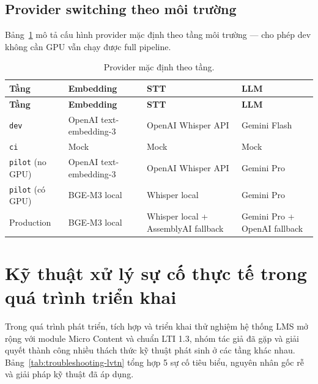 \subsection{Provider switching theo môi trường}

Bảng~\ref{tab:provider-matrix} mô tả cấu hình provider mặc định theo
tầng môi trường --- cho phép dev không cần GPU vẫn chạy được full
pipeline.

\begin{longtable}{|p{2.5cm}|p{3.5cm}|p{3.5cm}|p{3.5cm}|}
\caption{Provider mặc định theo tầng.}
\label{tab:provider-matrix} \\
\hline
\textbf{Tầng} & \textbf{Embedding} & \textbf{STT} & \textbf{LLM} \\
\hline
\endfirsthead
\hline
\textbf{Tầng} & \textbf{Embedding} & \textbf{STT} & \textbf{LLM} \\
\hline
\endhead

\texttt{dev} & OpenAI text-embedding-3 & OpenAI Whisper API &
    Gemini Flash \\
\hline
\texttt{ci} & Mock & Mock & Mock \\
\hline
\texttt{pilot} (no GPU) & OpenAI text-embedding-3 & OpenAI Whisper API
    & Gemini Pro \\
\hline
\texttt{pilot} (có GPU) & BGE-M3 local & Whisper local &
    Gemini Pro \\
\hline
Production & BGE-M3 local & Whisper local + AssemblyAI fallback
    & Gemini Pro + OpenAI fallback \\
\hline
\end{longtable}

\section{Kỹ thuật xử lý sự cố thực tế trong quá trình triển khai}
\label{sec:troubleshooting-lvtn}

Trong quá trình phát triển, tích hợp và triển khai thử nghiệm hệ thống LMS mở rộng với module Micro Content và chuẩn LTI 1.3, nhóm tác giả đã gặp và giải quyết thành công nhiều thách thức kỹ thuật phát sinh ở các tầng khác nhau. Bảng~\ref{tab:troubleshooting-lvtn} tổng hợp 5 sự cố tiêu biểu, nguyên nhân gốc rễ và giải pháp kỹ thuật đã áp dụng.

